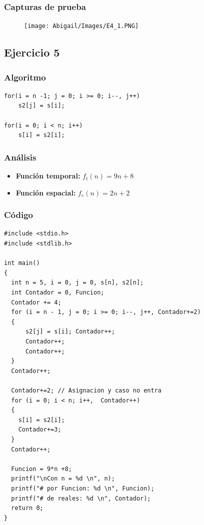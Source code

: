 \documentclass[12pt]{article}
\begin{document}
    		\subsubsection{Capturas de prueba}
				\begin{figure}[h!]
	                \centering
	                \texttt{[image: Abigail/Images/E4\_1.PNG]}
	 		    \end{figure} 

	    \subsection{Ejercicio 5}
	    	\subsubsection{Algoritmo}
	        \begin{lstlisting}[style=Java]
for(i = n -1; j = 0; i >= 0; i--, j++)
	s2[j] = s[i];

for(i = 0; i < n; i++)
	s[i] = s2[i];
    		\end{lstlisting}
    		\subsubsection{Análisis}
    			\begin{itemize}
    				\item[\Checkmark] \textbf{Función temporal:} $f_{t}(n) = 9n + 8 $
    				\item[\Checkmark] \textbf{Función espacial:} $f_{e}(n) = 2n + 2 $
    			\end{itemize}
    		\subsubsection{Código}
    		\begin{lstlisting}[style=Java]
#include <stdio.h>
#include <stdlib.h>

int main() 
{
  int n = 5, i = 0, j = 0, s[n], s2[n];
  int Contador = 0, Funcion;
  Contador += 4;
  for (i = n - 1, j = 0; i >= 0; i--, j++, Contador+=2)
  {
  	  s2[j] = s[i]; Contador++;
  	  Contador++;
  	  Contador++;
  }
  Contador++;

  Contador+=2; // Asignacion y caso no entra
  for (i = 0; i < n; i++,  Contador++)
  {
  	s[i] = s2[i];
  	Contador+=3;
  } 
  Contador++;
  	
  Funcion = 9*n +8;
  printf("\nCon n = %d \n", n); 
  printf("# por Funcion: %d \n", Funcion);
  printf("# de reales: %d \n", Contador);
  return 0;
}
	   		\end{lstlisting}
\end{document}
